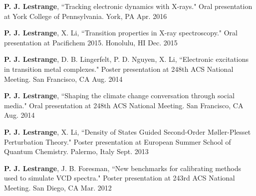 


\begin{cvpresentations}


\cvpresentation
{\textbf{P. J. Lestrange}, ``Tracking electronic dynamics with X-rays."  Oral presentation at York College of Pennsylvania.} %
{York, PA} %
{Apr. 2016} %


\cvpresentation
{\textbf{P. J. Lestrange}, X. Li, ``Transition properties in X-ray spectroscopy." Oral presentation at Pacifichem 2015.} %
{Honolulu, HI} %
{Dec. 2015} %


\cvpresentation
{\textbf{P. J. Lestrange}, D. B. Lingerfelt, P. D. Nguyen, X. Li, ``Electronic excitations in transition metal complexes." Poster presentation at 248th ACS National Meeting.} %
{San Francisco, CA} %
{Aug. 2014} %


\cvpresentation
{\textbf{P. J. Lestrange}, ``Shaping the climate change conversation through social media." Oral presentation at 248th ACS National Meeting.} %
{San Francisco, CA} %
{Aug. 2014} %


\cvpresentation
{\textbf{P. J. Lestrange}, X. Li, ``Density of States Guided Second-Order M{\o}ller-Plesset Perturbation Theory." Poster presentation at European Summer School of Quantum Chemistry.} %
{Palermo, Italy} %
{Sept. 2013} %


\cvpresentation
{\textbf{P. J. Lestrange}, J. B. Foresman, ``New benchmarks for calibrating methods used to simulate VCD spectra." Poster presentation at 243rd ACS National Meeting.} %
{San Diego, CA} %
{Mar. 2012} %


\end{cvpresentations}
